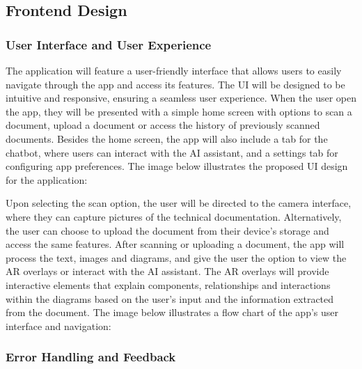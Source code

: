 \documentclass[12pt]{article}
\begin{document}
    \subsection{Frontend Design}

    \subsubsection{User Interface and User Experience}

        The application will feature a user-friendly interface that allows users to easily navigate through the app and access its features. The UI will be designed to be intuitive and responsive, ensuring a seamless user experience. When the user open the app, they will be presented with
        a simple home screen with options to scan a document, upload a document or access the history of previously scanned documents. Besides the home screen, the app will also include a tab for the chatbot, where users can interact with the AI assistant, and a settings tab for configuring
        app preferences. The image below illustrates the proposed UI design for the application:


        Upon selecting the scan option, the user will be directed to the camera interface, where they can capture pictures of the technical documentation. Alternatively, the user can choose to upload the document from their device's storage and access the same features. After scanning or uploading
        a document, the app will process the text, images and diagrams, and give the user the option to view the AR overlays or interact with the AI assistant. The AR overlays will provide interactive elements that explain components, relationships and interactions within the diagrams based on the user's
        input and the information extracted from the document. The image below illustrates a flow chart of the app's user interface and navigation:

    \subsubsection{Error Handling and Feedback}
\end{document}

